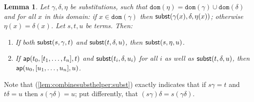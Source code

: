 \documentclass{lmcs}
\theoremstyle{theorem}\newtheorem{theorem}[dummy]{Theorem}
\theoremstyle{theorem}\newtheorem{lemma}[dummy]{Lemma}
\theoremstyle{theorem}\newtheorem{corollary}[dummy]{Corollary}
\theoremstyle{definition}\newtheorem{definition}[dummy]{Definition}
\theoremstyle{definition}\newtheorem{example}[dummy]{Example}
\newcommand{\domain}{\mathtt{dom}}
\begin{document}
\begin{lemma}\label{lem:combinesubsthelper}
Let $\gamma,\delta,\eta$ be substitutions, such that $\domain(\eta) = \domain(\gamma) \cup \domain(\delta)$
and for all $x$ in this domain: if $x \in \domain(\gamma)$ then $\mathsf{subst}(\gamma(x),\delta,\eta(x))$;
otherwise $\eta(x) = \delta(x)$.  Let $s,t,u$ be terms.  Then:
\begin{enumerate}
\item\label{lem:combinesubsthelper:subst}
  If both $\mathsf{subst}(s,\gamma,t)$ and $\mathsf{subst}(t,\delta,u)$, then $\mathsf{subst}(s,\eta,u)$.
\item\label{lem:combinesubsthelper:appl}
  If $\mathsf{ap}(t_0,[t_1,\dots,t_n],t)$ and $\mathsf{subst}(t_i,\delta,u_i)$ for all $i$ as well as
  $\mathsf{subst}(t,\delta,u)$, then $\mathsf{ap}(u_0,[u_1,\dots,u_n],u)$.
\end{enumerate}
\end{lemma}

Note that (\ref{lem:combinesubsthelper:subst}) exactly indicates that if $s\gamma = t$ and $t\delta = u$
then $s(\gamma\delta) = u$; put differently, that $(s\gamma)\delta = s(\gamma\delta)$.
\end{document}

